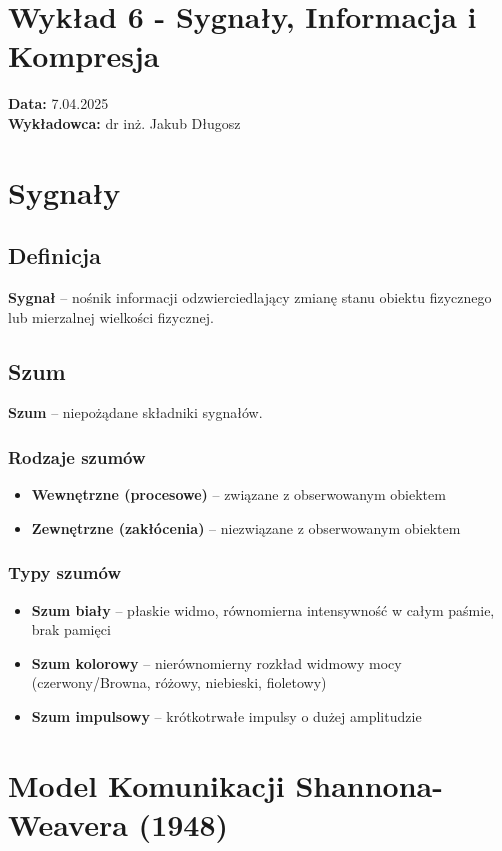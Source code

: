 \section*{Wykład 6 - Sygnały, Informacja i Kompresja}
\textbf{Data:} 7.04.2025 \\
\textbf{Wykładowca:} dr inż. Jakub Długosz

\section{Sygnały}

\subsection{Definicja}
\textbf{Sygnał} -- nośnik informacji odzwierciedlający zmianę stanu obiektu fizycznego lub mierzalnej wielkości fizycznej.

\subsection{Szum}
\textbf{Szum} -- niepożądane składniki sygnałów.

\subsubsection{Rodzaje szumów}
\begin{itemize}[noitemsep]
    \item \textbf{Wewnętrzne (procesowe)} -- związane z obserwowanym obiektem
    \item \textbf{Zewnętrzne (zakłócenia)} -- niezwiązane z obserwowanym obiektem
\end{itemize}

\subsubsection{Typy szumów}
\begin{itemize}[noitemsep]
    \item \textbf{Szum biały} -- płaskie widmo, równomierna intensywność w całym paśmie, brak pamięci
    \item \textbf{Szum kolorowy} -- nierównomierny rozkład widmowy mocy (czerwony/Browna, różowy, niebieski, fioletowy)
    \item \textbf{Szum impulsowy} -- krótkotrwałe impulsy o dużej amplitudzie
\end{itemize}

\section{Model Komunikacji Shannona-Weavera (1948)}

